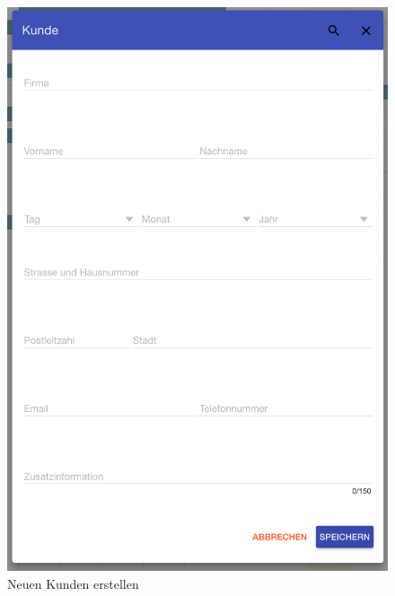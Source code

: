 \begin{figure}[H]
    \centering
    \begin{minipage}[t]{0.49\linewidth}
        \centering
        \includegraphics[width=\linewidth]{images/frontend_customer_new.png}
        \caption{Neuen Kunden erstellen}
        \label{frontend_customer_new}
    \end{minipage}
    \hfill
    \begin{minipage}[t]{0.49\linewidth}
        \centering

\end{minipage}
\end{figure}
